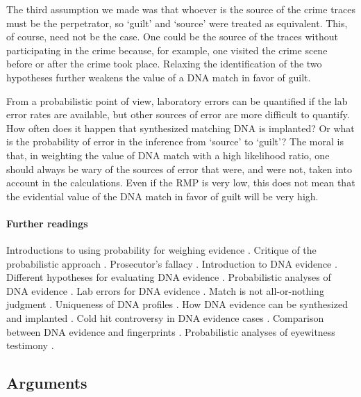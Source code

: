 \documentclass[10pt]{article}
\begin{document}
The third assumption we made was that whoever is the source of the crime traces must be the perpetrator, 
so `guilt' and `source' were treated as equivalent.  This, of course, need not be the case. One could be the source of the traces without participating in the crime because, for example, 
 one visited the crime scene before or after  the crime took place. Relaxing the identification of the two hypotheses 
further weakens the value of a DNA match in favor of guilt.

From a probabilistic point of view, laboratory errors can be quantified if the lab error rates are available, 
but other sources of error are more difficult to quantify. How often does it happen that 
synthesized matching DNA is implanted? Or what is the probability of error 
in the inference from `source' to `guilt'?
The moral is that, in weighting the value of DNA match with a high likelihood ratio, 
one should always be wary of the sources of error that were, and were not, taken into account in the calculations. 
Even if the RMP is very low, this does not mean 
that the evidential value of the DNA match in favor of guilt will be very high. 


\paragraph{Further readings} Introductions to using probability for weighing evidence 
 \citep{finkelsteinFairley1970, dawid2002, morteraDawid2007}. Critique 
of the probabilistic approach \citep{tribe1971, cohen1977, allenPardo2007}.
Prosecutor's fallacy \citep{thompsonSchuman1987}.
Introduction to DNA evidence \citep{wasserman2008, kayeSensabaugh2000}.
Different hypotheses for evaluating DNA evidence \citep{koehler1993, cookEtAl1998, evettEtal2000}. 
Probabilistic analyses of DNA evidence  \citep{robertsonVignaux1995, buckleton2005, balding2005}. 
 Lab errors for DNA evidence \citep{thompsonEtAl2003}. 
 Match is not all-or-nothing judgment \citep{kaye1993}. 
Uniqueness of DNA profiles  \citep{kaye2013, weir2007}.
How DNA evidence can be synthesized and implanted \citep{frumkinEtAl2009}. 
Cold hit controversy in DNA evidence cases \citep{NRC1996, baldingDonnely1996}. 
Comparison between DNA evidence and fingerprints  \citep{zabell2005}. 
Probabilistic analyses of eyewitness testimony \citep{friedman1987, schum1994, schumStarace2001}. 

\subsection{Arguments}
\label{sec:valueArgs}
\end{document}
